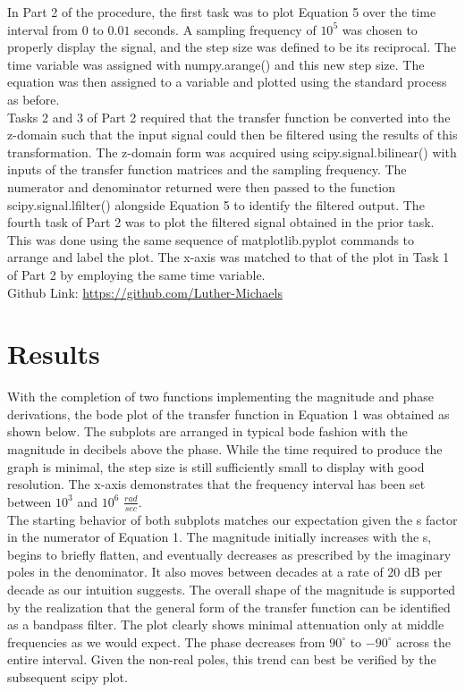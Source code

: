 \documentclass[12pt]{report}
\begin{document}
In Part 2 of the procedure, the first task was to plot Equation 5 over the time interval from $ 0 $ to $ 0.01 $ seconds. A sampling frequency of $ 10^5 $ was chosen to properly display the signal, and the step size was defined to be its reciprocal. The time variable was assigned with numpy.arange() and this new step size. The equation was then assigned to a variable and plotted using the standard process as before. \\

Tasks 2 and 3 of Part 2 required that the transfer function be converted into the z-domain such that the input signal could then be filtered using the results of this transformation. The z-domain form was acquired using scipy.signal.bilinear() with inputs of the transfer function matrices and the sampling frequency. The numerator and denominator returned were then passed to the function scipy.signal.lfilter() alongside Equation 5 to identify the filtered output. The fourth task of Part 2 was to plot the filtered signal obtained in the prior task. This was done using the same sequence of matplotlib.pyplot commands to arrange and label the plot. The x-axis was matched to that of the plot in Task 1 of Part 2 by employing the same time variable. \\

Github Link: \url{https://github.com/Luther-Michaels} \\

\section{Results}

With the completion of two functions implementing the magnitude and phase derivations, the bode plot of the transfer function in Equation 1 was obtained as shown below. The subplots are arranged in typical bode fashion with the magnitude in decibels above the phase. While the time required to produce the graph is minimal, the step size is still sufficiently small to display with good resolution. The x-axis demonstrates that the frequency interval has been set between $ 10^3 $ and $ 10^6 $ $ \frac{rad}{sec} $. \\

The starting behavior of both subplots matches our expectation given the s factor in the numerator of Equation 1. The magnitude initially increases with the s, begins to briefly flatten, and eventually decreases as prescribed by the imaginary poles in the denominator. It also moves between decades at a rate of 20 dB per decade as our intuition suggests. The overall shape of the magnitude is supported by the realization that the general form of the transfer function can be identified as a bandpass filter. The plot clearly shows minimal attenuation only at middle frequencies as we would expect. The phase decreases from $ 90^\circ $ to $ -90^\circ $ across the entire interval. Given the non-real poles, this trend can best be verified by the subsequent scipy plot. \\
\end{document}
